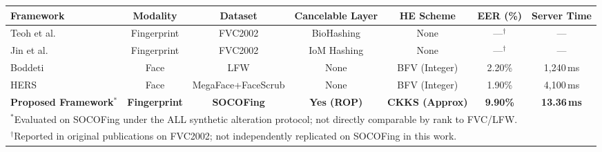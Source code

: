 \begin{tabular}{lcccccc}
\toprule
\textbf{Framework} & \textbf{Modality} & \textbf{Dataset} & \textbf{Cancelable Layer} & \textbf{HE Scheme} & \textbf{EER (\%)} & \textbf{Server Time} \\
\midrule
Teoh et al.~\cite{teoh2004biohashing} & Fingerprint & FVC2002 & BioHashing & None & ---$^\dagger$ & --- \\
Jin et al.~\cite{jin2018ranking} & Fingerprint & FVC2002 & IoM Hashing & None & ---$^\dagger$ & --- \\
Boddeti~\cite{boddeti2018secure} & Face & LFW & None & BFV (Integer) & 2.20\% & 1{,}240\,ms \\
HERS~\cite{engelsma2022hers} & Face & MegaFace+FaceScrub & None & BFV (Integer) & 1.90\% & 4{,}100\,ms \\
\textbf{Proposed Framework}$^*$ & \textbf{Fingerprint} & \textbf{SOCOFing} & \textbf{Yes (ROP)} & \textbf{CKKS (Approx)} & \textbf{9.90\%} & \textbf{13.36\,ms} \\
\bottomrule
\multicolumn{7}{l}{\footnotesize $^*$Evaluated on SOCOFing under the ALL synthetic alteration protocol; not directly comparable by rank to FVC/LFW.} \\
\multicolumn{7}{l}{\footnotesize $^\dagger$Reported in original publications on FVC2002; not independently replicated on SOCOFing in this work.}
\end{tabular}
